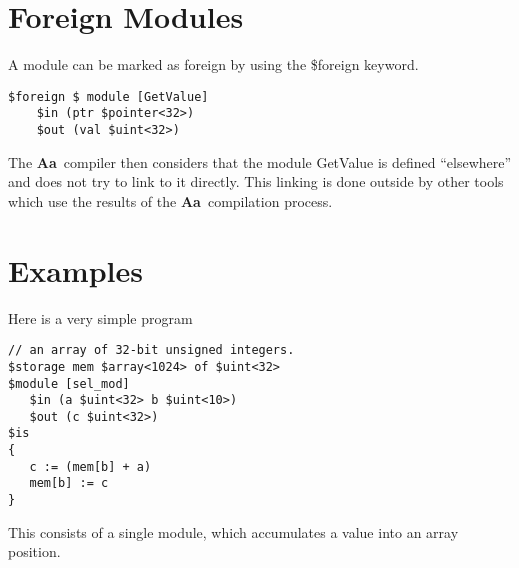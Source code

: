 \documentclass{article}
\newcommand{\Aa}{{\bf Aa}~}
\begin{document}
\section{Foreign Modules}

A module can be marked as foreign by using the
\$foreign keyword.
\begin{verbatim}
$foreign $ module [GetValue]
	$in (ptr $pointer<32>)
	$out (val $uint<32>)
\end{verbatim}
The \Aa compiler then considers that the module GetValue
is defined ``elsewhere'' and does not try to link to it
directly.  This linking is done outside by other tools which
use the results of the \Aa compilation process.

\section{Examples}

Here is a very simple program
\begin{verbatim}
// an array of 32-bit unsigned integers.
$storage mem $array<1024> of $uint<32> 
$module [sel_mod]
   $in (a $uint<32> b $uint<10>)
   $out (c $uint<32>)
$is
{
   c := (mem[b] + a)
   mem[b] := c
}
\end{verbatim}
This consists of a single module, which accumulates
a value into an array position.
\end{document}
